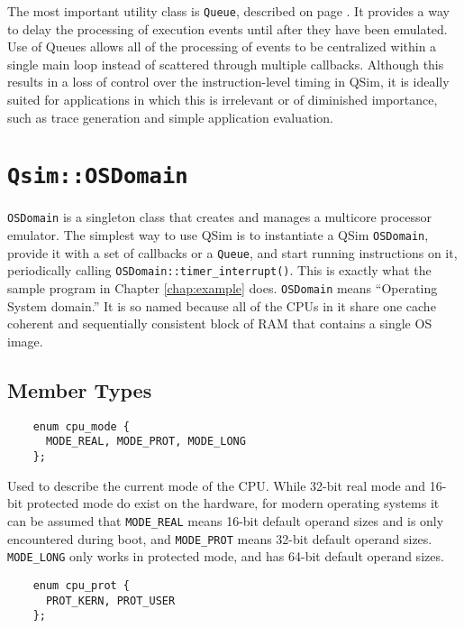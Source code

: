 \documentclass[letterpaper, 10pt]{book}
\begin{document}
The most important utility class is \texttt{Queue}, described on page
\pageref{class:Queue}. It provides a way to delay the processing of execution
events until after they have been emulated. Use of Queues allows all of the
processing of events to be centralized within a single main loop instead of
scattered through multiple callbacks. Although this results in a loss of control
over the instruction-level timing in QSim, it is ideally suited for applications
in which this is irrelevant or of diminished importance, such as trace
generation and simple application evaluation.
\newpage

\section{\texttt{Qsim::OSDomain}} \label{class:OSDomain}

\texttt{OSDomain} is a singleton class that creates and manages a multicore
processor emulator. The simplest way to use QSim is to instantiate a QSim
\texttt{OSDomain}, provide it with a set of callbacks or a \texttt{Queue}, and
start running instructions on it, periodically calling 
\texttt{OSDomain::timer\_interrupt()}. This is exactly what the sample program
in Chapter \ref{chap:example} does. \texttt{OSDomain} means ``Operating System
domain.'' It is so named because all of the CPUs in it share one cache coherent
and sequentially consistent block of RAM that contains a single OS image.

\subsection{Member Types}
\label{enum:cpu_mode} \begin{verbatim}
    enum cpu_mode {
      MODE_REAL, MODE_PROT, MODE_LONG
    };
\end{verbatim}

Used to describe the current mode of the CPU. While 32-bit real mode and 16-bit
protected mode do exist on the hardware, for modern operating systems it can be
assumed that \texttt{MODE\_REAL} means 16-bit default operand sizes and is only
encountered during boot, and \texttt{MODE\_PROT} means 32-bit default operand
sizes. \texttt{MODE\_LONG} only works in protected mode, and has 64-bit default
operand sizes.

\label{enum:cpu_prot} \begin{verbatim}
    enum cpu_prot {
      PROT_KERN, PROT_USER
    };
\end{verbatim}
\end{document}
